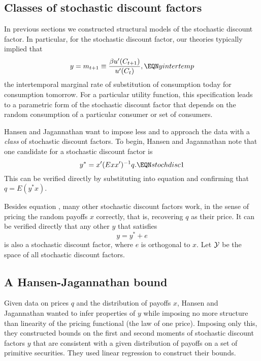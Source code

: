 \subsection{Classes of stochastic discount factors}

   In previous sections we constructed structural models of the stochastic
discount factor. In particular, for the stochastic discount factor, our
theories typically implied that
$$ y = m_{t+1} \equiv {\beta u'(C_{t+1})\over u'(C_t) }, \EQN yintertemp $$
the intertemporal marginal rate of substitution of consumption today for consumption
tomorrow.  For a particular utility function, this specification
leads to a parametric form of the stochastic discount factor that
depends on the random  consumption of a particular consumer
or set of consumers.

 Hansen and Jagannathan want to impose less and to approach the data with a {\it class\/}
of stochastic discount factors.  To begin, Hansen and Jagannathan note
that one candidate for a stochastic discount factor is
$$ y^* = x'(E x x')^{-1} q. \EQN stochdisc1 $$
This can be verified directly by substituting into
equation  and confirming that $q = E(y^* x)$.

Besides equation , many other stochastic discount
factors work, in the sense of pricing the random
payoffs $x$ correctly, that is, recovering $q$ as their price.
It can be verified directly that any other $y$ that satisfies
$$ y = y^* + e $$
is also a stochastic discount factor, where $e$ is orthogonal to $x$.
Let ${\cal Y}$ be the space of all stochastic discount factors.

\subsection{A Hansen-Jagannathan bound}

  Given data on prices $q$ and the distribution of payoffs $x$,
Hansen and Jagannathan wanted to infer properties
of $y$ while imposing no more structure than linearity
of the pricing functional (the law of one price).  Imposing only this,
they constructed bounds on the first and second moments of stochastic
discount factors $y$ that are consistent with a given distribution
of payoffs on a  set of primitive securities.  %
They  used linear regression   to construct their bounds.

